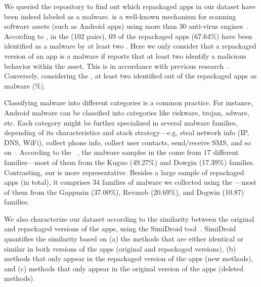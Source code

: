 We queried the \vt repository to find out which repackaged apps in our
dataset have been indeed labeled as a malware. \vt is a well-known mechanism for
scanning software assets (such as Android apps) using more than 30 anti-virus engines~\cite{DBLP:journals/ese/KhanmohammadiEH19}.
According to \vt, in the \sds (102 pairs),
69 of the repackaged apps (67.64\%) have been identified as a malware by at least two
\ses. Here we only consider that a repackaged version of an app is a malware if \vt reports that at least
two \ses identify a malicious behavior within the asset. This is in accordance with previous research~\cite{vt-label,DBLP:journals/ese/KhanmohammadiEH19}. Conversely, considering the \cds, at least two \se identified \malwares out of the \apps repackaged apps as malware (\malwaresP\%).

Classifying malware into different categories is a common practice. For instance, Android malware can be classified into categories
like riskware, trojan, adware, etc. Each category might be further specialized in several malware families, depending of its
characteristics and atack strategy---e.g, steal network info (IP, DNS, WiFi), collect phone info,
collect user contacts, send/receive SMS, and so on~\cite{DBLP:conf/iccns/RahaliLKTGM20}.
According to the
\avt~\cite{avclass2-paper}, the malware samples in the \sds come from $17$ different families---most of them from the Kuguo (49.27\%) and Dowgin (17.39\%) families.
Contrasting, our \cds is more representative. Besides a large sample of repackaged apps (\apps in total), it
comprises 34 families of malware we collected using the \avt---most
of them from the Gappusin (37.00\%), Revmob (20.69\%), and Dogwin (10.87) families.

We also characterize our dataset according to the similarity
between the original and repackaged versions of the apps, using the  
SimiDroid tool~\cite{DBLP:conf/trustcom/0029BK17}. SimiDroid quantifies the similarity
based on (a) the methods that are either identical or similar in both versions of the apps (original and repackaged versions),
(b) methods that only appear in the repackaged version of the apps (new methods), and (c) methods that only appear in the
original version of the apps (deleted methods).

